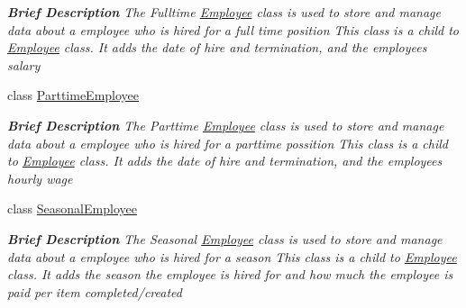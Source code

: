 \begin{DoxyCompactItemize}
\begin{DoxyCompactList}\small\item\em {\bfseries Brief Description} The Fulltime \hyperlink{class_all_employees_1_1_employee}{Employee} class is used to store and manage data about a employee who is hired for a full time position This class is a child to \hyperlink{class_all_employees_1_1_employee}{Employee} class. It adds the date of hire and termination, and the employees salary \end{DoxyCompactList}\item 
class \hyperlink{class_all_employees_1_1_parttime_employee}{Parttime\+Employee}
\begin{DoxyCompactList}\small\item\em {\bfseries Brief Description} The Parttime \hyperlink{class_all_employees_1_1_employee}{Employee} class is used to store and manage data about a employee who is hired for a parttime possition This class is a child to \hyperlink{class_all_employees_1_1_employee}{Employee} class. It adds the date of hire and termination, and the employees hourly wage \end{DoxyCompactList}\item 
class \hyperlink{class_all_employees_1_1_seasonal_employee}{Seasonal\+Employee}
\begin{DoxyCompactList}\small\item\em {\bfseries Brief Description} The Seasonal \hyperlink{class_all_employees_1_1_employee}{Employee} class is used to store and manage data about a employee who is hired for a season This class is a child to \hyperlink{class_all_employees_1_1_employee}{Employee} class. It adds the season the employee is hired for and how much the employee is paid per item completed/created \end{DoxyCompactList}\end{DoxyCompactItemize}
